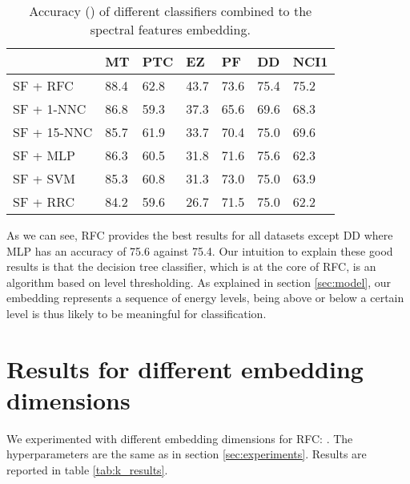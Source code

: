 \documentclass{article}
\begin{document}
\begin{table}[h]
  \begin{center}
  \renewcommand{\arraystretch}{1.2}
    \begin{tabular}[t]{l|M{1.2cm} M{1.2cm} M{1.2cm} M{1.2cm} M{1.2cm} M{1.2cm}}
                    & MT   &     PTC       &      EZ       & PF      & DD      & NCI1 \\
    \hline
      SF + RFC    & 88.4 & 62.8 & 43.7 & 73.6 &  75.4   & 75.2 \\
      SF + 1-NNC  & 86.8 & 59.3 & 37.3 & 65.6 &  69.6   & 68.3 \\
      SF + 15-NNC & 85.7 & 61.9 & 33.7 & 70.4 &  75.0   & 69.6 \\
      SF + MLP    & 86.3 & 60.5 & 31.8 & 71.6 &  75.6   & 62.3 \\
      SF + SVM    & 85.3 & 60.8 & 31.3 & 73.0 &  75.0   & 63.9 \\
      SF + RRC    & 84.2 & 59.6 & 26.7 & 71.5 &  75.0   & 62.2 \\
      
      \end{tabular}
      \renewcommand{\arraystretch}{4}
  \end{center}
  \caption{Accuracy () of different classifiers combined to the spectral features embedding.}
  \label{tab:all_results}
\end{table}



As we can see, RFC provides the best results for all datasets except DD where MLP has an accuracy of 75.6 against 75.4. Our intuition to explain these good results is that the decision tree classifier, which is at the core of RFC, is an algorithm based on level thresholding. As explained in section \ref{sec:model}, our embedding represents a sequence of energy levels, being above or below a certain level is thus likely to be meaningful for classification.

\section{Results for different embedding dimensions}
\label{app:k_results}

We experimented with different embedding dimensions for RFC: . The hyperparameters are the same as in section \ref{sec:experiments}. Results are reported in table \ref{tab:k_results}.
\end{document}
